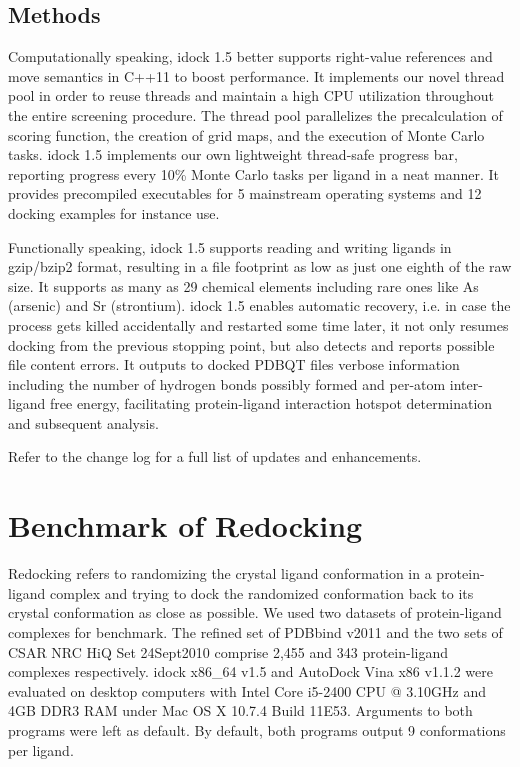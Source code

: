 \documentclass{bioinfo}
\begin{document}
\begin{methods}
\section{Methods}

Computationally speaking, idock 1.5 better supports right-value references and move semantics in C++11 to boost performance. It implements our novel thread pool in order to reuse threads and maintain a high CPU utilization throughout the entire screening procedure. The thread pool parallelizes the precalculation of scoring function, the creation of grid maps, and the execution of Monte Carlo tasks. idock 1.5 implements our own lightweight thread-safe progress bar, reporting progress every 10\% Monte Carlo tasks per ligand in a neat manner. It provides precompiled executables for 5 mainstream operating systems and 12 docking examples for instance use.

Functionally speaking, idock 1.5 supports reading and writing ligands in gzip/bzip2 format, resulting in a file footprint as low as just one eighth of the raw size. It supports as many as 29 chemical elements including rare ones like As (arsenic) and Sr (strontium). idock 1.5 enables automatic recovery, i.e. in case the process gets killed accidentally and restarted some time later, it not only resumes docking from the previous stopping point, but also detects and reports possible file content errors. It outputs to docked PDBQT files verbose information including the number of hydrogen bonds possibly formed and per-atom inter-ligand free energy, facilitating protein-ligand interaction hotspot determination and subsequent analysis.

Refer to the change log for a full list of updates and enhancements.

\end{methods}

\section{Benchmark of Redocking}

Redocking refers to randomizing the crystal ligand conformation in a protein-ligand complex and trying to dock the randomized conformation back to its crystal conformation as close as possible. We used two datasets of protein-ligand complexes for benchmark. The refined set of PDBbind v2011 \citep{530} and the two sets of CSAR NRC HiQ Set 24Sept2010 \citep{857} comprise 2,455 and 343 protein-ligand complexes respectively. idock x86\_64 v1.5 and AutoDock Vina x86 v1.1.2 were evaluated on desktop computers with Intel Core i5-2400 CPU @ 3.10GHz and 4GB DDR3 RAM under Mac OS X 10.7.4 Build 11E53. Arguments to both programs were left as default. By default, both programs output 9 conformations per ligand.
\end{document}
